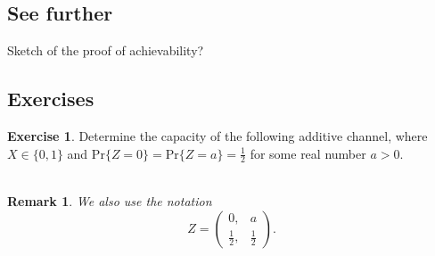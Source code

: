 \documentclass[a4paper, 11pt, openany]{book}
\numberwithin{equation}{section}
\theoremstyle{plain}
\newtheorem{remark}		[equation]	{Remark}
\theoremstyle{definition}
\newtheorem{exercise}   {Exercise}  [section]
\newcommand{\Structure}[1]{\textcolor{blue}{#1}}
\begin{document}
% 


\subsection{See further}

Sketch of the proof of achievability?



\subsection{Exercises}

\begin{exercise}
Determine the capacity of the following additive channel, where $X \in \{0,1\}$ and $\mathrm{Pr}\{Z = 0\} = \mathrm{Pr}\{Z = a\} = \frac{1}{2}$ for some real number $a > 0$.\\
~\\
\begin{center}
\end{center}
\end{exercise}

\begin{remark}
We also use the notation 
$$
	Z = \begin{pmatrix}
		0, & a\\
		\frac{1}{2}, & \frac{1}{2}
	\end{pmatrix}.
$$
\end{remark}
\end{document}
